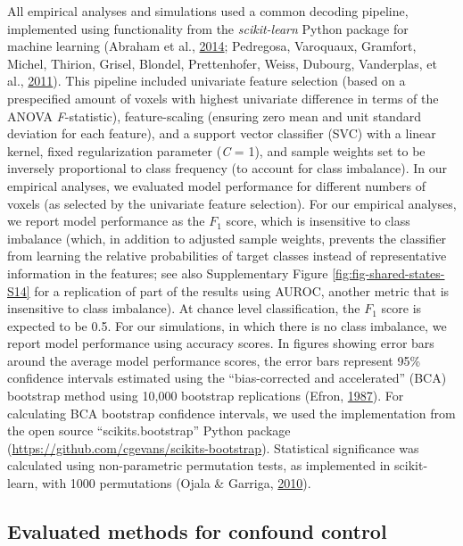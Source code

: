 \documentclass[12pt,american,a4paper,oneside,]{memoir} %
\begin{document}
All empirical analyses and simulations used a common decoding pipeline, implemented using functionality from the \emph{scikit-learn} Python package for machine learning (Abraham et al., \protect\hyperlink{ref-Abraham2014-ef}{2014}; Pedregosa, Varoquaux, Gramfort, Michel, Thirion, Grisel, Blondel, Prettenhofer, Weiss, Dubourg, Vanderplas, et al., \protect\hyperlink{ref-Pedregosa2011-bp}{2011}). This pipeline included univariate feature selection (based on a prespecified amount of voxels with highest univariate difference in terms of the ANOVA \emph{F}-statistic), feature-scaling (ensuring zero mean and unit standard deviation for each feature), and a support vector classifier (SVC) with a linear kernel, fixed regularization parameter (\emph{C} = 1), and sample weights set to be inversely proportional to class frequency (to account for class imbalance). In our empirical analyses, we evaluated model performance for different numbers of voxels (as selected by the univariate feature selection). For our empirical analyses, we report model performance as the \(F_{1}\) score, which is insensitive to class imbalance (which, in addition to adjusted sample weights, prevents the classifier from learning the relative probabilities of target classes instead of representative information in the features; see also Supplementary Figure \ref{fig:fig-shared-states-S14} for a replication of part of the results using AUROC, another metric that is insensitive to class imbalance). At chance level classification, the \(F_{1}\) score is expected to be 0.5. For our simulations, in which there is no class imbalance, we report model performance using accuracy scores. In figures showing error bars around the average model performance scores, the error bars represent 95\% confidence intervals estimated using the ``bias-corrected and accelerated'' (BCA) bootstrap method using 10,000 bootstrap replications (Efron, \protect\hyperlink{ref-efron1987better}{1987}). For calculating BCA bootstrap confidence intervals, we used the implementation from the open source ``scikits.bootstrap'' Python package (\url{https://github.com/cgevans/scikits-bootstrap}). Statistical significance was calculated using non-parametric permutation tests, as implemented in scikit-learn, with 1000 permutations (Ojala \& Garriga, \protect\hyperlink{ref-Ojala2010-rc}{2010}).

\hypertarget{confounds-decoding-methods-evaluated-methods}{%
\subsection{Evaluated methods for confound control}\label{confounds-decoding-methods-evaluated-methods}}
\end{document}
